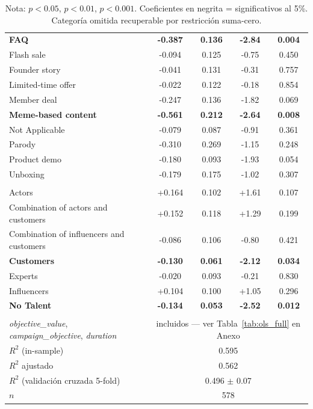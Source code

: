 \begin{table}[H]
\begin{tabular}{lcccc}
\quad \textbf{FAQ} & \textbf{-0.387}\sym{**} & \textbf{0.136} & \textbf{-2.84} & \textbf{0.004} \\
\quad Flash sale & -0.094 & 0.125 & -0.75 & 0.450 \\
\quad Founder story & -0.041 & 0.131 & -0.31 & 0.757 \\
\quad Limited-time offer & -0.022 & 0.122 & -0.18 & 0.854 \\
\quad Member deal & -0.247 & 0.136 & -1.82 & 0.069 \\
\quad \textbf{Meme-based content} & \textbf{-0.561}\sym{**} & \textbf{0.212} & \textbf{-2.64} & \textbf{0.008} \\
\quad Not Applicable & -0.079 & 0.087 & -0.91 & 0.361 \\
\quad Parody & -0.310 & 0.269 & -1.15 & 0.248 \\
\quad Product demo & -0.180 & 0.093 & -1.93 & 0.054 \\
\quad Unboxing & -0.179 & 0.175 & -1.02 & 0.307 \\
\addlinespace
\multicolumn{5}{l}{\textit{Talent Type}} \\
\quad Actors & +0.164 & 0.102 & +1.61 & 0.107 \\
\quad Combination of actors and customers & +0.152 & 0.118 & +1.29 & 0.199 \\
\quad Combination of influencers and customers & -0.086 & 0.106 & -0.80 & 0.421 \\
\quad \textbf{Customers} & \textbf{-0.130}\sym{*} & \textbf{0.061} & \textbf{-2.12} & \textbf{0.034} \\
\quad Experts & -0.020 & 0.093 & -0.21 & 0.830 \\
\quad Influencers & +0.104 & 0.100 & +1.05 & 0.296 \\
\quad \textbf{No Talent} & \textbf{-0.134}\sym{*} & \textbf{0.053} & \textbf{-2.52} & \textbf{0.012} \\
\addlinespace
\midrule
\multicolumn{5}{l}{\textit{Controles de campaña}} \\
\quad \textit{objective\_value}, \textit{campaign\_objective}, \textit{duration} & \multicolumn{4}{c}{incluidos — ver Tabla~\ref{tab:ols_full} en Anexo} \\
\midrule
$R^2$ (in-sample) & \multicolumn{4}{c}{0.595} \\
$R^2$ ajustado & \multicolumn{4}{c}{0.562} \\
$R^2$ (validación cruzada 5-fold) & \multicolumn{4}{c}{0.496 $\pm$ 0.07} \\
$n$ & \multicolumn{4}{c}{578} \\
\bottomrule
\end{tabular}
\caption*{\small Nota: \sym{*} $p<0.05$, \sym{**} $p<0.01$, \sym{***} $p<0.001$. Coeficientes en negrita = significativos al 5\%. Categoría omitida recuperable por restricción suma-cero.}
\end{table}